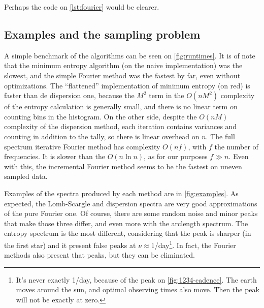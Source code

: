 Perhaps the code on \autoref{lst:fourier} would be clearer.

\subsection{Examples and the sampling problem}

A simple benchmark of the algorithms can be seen on \autoref{fig:runtimes}. 
It is of note that the minimum entropy algorithm (on the naive implementation) was the slowest, 
and the simple Fourier method was the fastest by far, even without optimizations.
The \enquote{flattened} implementation of minimum entropy (on red) is faster than de dispersion one, because the $M^2$ term in the 
$O(nM^2)$ complexity of the entropy calculation is generally small, and there is no linear term on counting bins in the histogram.
On the other side, despite the $O(nM)$ complexity of the dispersion method, each iteration contains variances and counting in addition to the tally,
so there is linear overhead on $n$.
The full spectrum iterative Fourier method has complexity $O(nf)$, with $f$ the number of frequencies.
It is slower than the $O(n \ln n)$, as for our purposes $f\gg n$.
Even with this, the incremental Fourier method seems to be the fastest on uneven sampled data.

Examples of the spectra produced by each method are in \autoref{fig:examples}.
As expected, the Lomb-Scargle and dispersion spectra are very good approximations of the pure Fourier one.
Of course, there are some random noise and minor peaks that make those three differ, and even more with the arclength spectrum.
The entropy spectrum is the most different, considering that the peak is sharper 
(in the first star) and it present false peaks at $\nu\approx 1$/day\footnote{
	It's never exactly 1/day, because of the peak on \autoref{fig:1234-cadence}. 
	The earth moves around the sun, and optimal observing times also move.
	Then the peak will not be exactly at zero.
}. In fact, the Fourier methods also present that peaks, but they can be eliminated.


